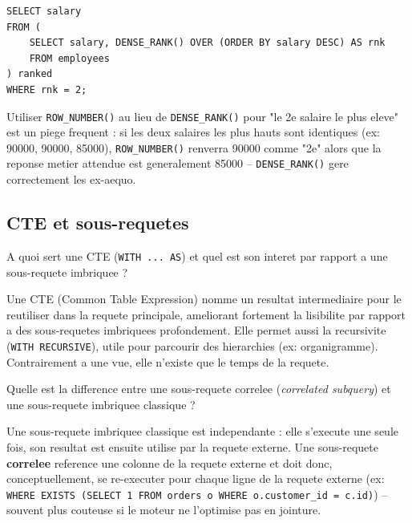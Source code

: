\documentclass[11pt,a4paper]{article}
\begin{document}
\begin{lstlisting}[style=sqlstyle]
SELECT salary
FROM (
    SELECT salary, DENSE_RANK() OVER (ORDER BY salary DESC) AS rnk
    FROM employees
) ranked
WHERE rnk = 2;
\end{lstlisting}

\begin{piege}
Utiliser \texttt{ROW\_NUMBER()} au lieu de \texttt{DENSE\_RANK()} pour "le 2e salaire le plus eleve" est un piege frequent : si les deux salaires les plus hauts sont identiques (ex: 90000, 90000, 85000), \texttt{ROW\_NUMBER()} renverra 90000 comme "2e" alors que la reponse metier attendue est generalement 85000 -- \texttt{DENSE\_RANK()} gere correctement les ex-aequo.
\end{piege}

\subsection{CTE et sous-requetes}

\begin{question} A quoi sert une CTE (\texttt{WITH ... AS}) et quel est son interet par rapport a une sous-requete imbriquee ?
\end{question}
\begin{reponse}
Une CTE (Common Table Expression) nomme un resultat intermediaire pour le reutiliser dans la requete principale, ameliorant fortement la lisibilite par rapport a des sous-requetes imbriquees profondement. Elle permet aussi la recursivite (\texttt{WITH RECURSIVE}), utile pour parcourir des hierarchies (ex: organigramme). Contrairement a une vue, elle n'existe que le temps de la requete.
\end{reponse}

\begin{question} Quelle est la difference entre une sous-requete correlee (\emph{correlated subquery}) et une sous-requete imbriquee classique ?
\end{question}
\begin{reponse}
Une sous-requete imbriquee classique est independante : elle s'execute une seule fois, son resultat est ensuite utilise par la requete externe. Une sous-requete \textbf{correlee} reference une colonne de la requete externe et doit donc, conceptuellement, se re-executer pour chaque ligne de la requete externe (ex: \texttt{WHERE EXISTS (SELECT 1 FROM orders o WHERE o.customer\_id = c.id)}) -- souvent plus couteuse si le moteur ne l'optimise pas en jointure.
\end{reponse}
\end{document}
